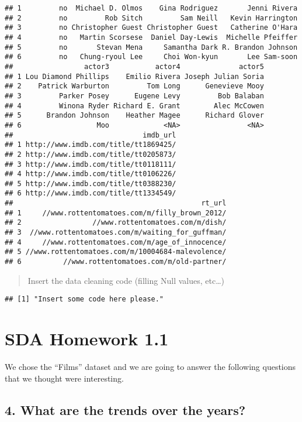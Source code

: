 \documentclass[]{article}
\begin{document}
\begin{verbatim}
## 1         no  Michael D. Olmos    Gina Rodriguez       Jenni Rivera
## 2         no         Rob Sitch         Sam Neill   Kevin Harrington
## 3         no Christopher Guest Christopher Guest   Catherine O'Hara
## 4         no   Martin Scorsese  Daniel Day-Lewis  Michelle Pfeiffer
## 5         no       Stevan Mena     Samantha Dark R. Brandon Johnson
## 6         no   Chung-ryoul Lee     Choi Won-kyun       Lee Sam-soon
##                 actor3           actor4              actor5
## 1 Lou Diamond Phillips    Emilio Rivera Joseph Julian Soria
## 2    Patrick Warburton         Tom Long      Genevieve Mooy
## 3         Parker Posey      Eugene Levy         Bob Balaban
## 4         Winona Ryder Richard E. Grant        Alec McCowen
## 5      Brandon Johnson    Heather Magee      Richard Glover
## 6                  Moo             <NA>                <NA>
##                               imdb_url
## 1 http://www.imdb.com/title/tt1869425/
## 2 http://www.imdb.com/title/tt0205873/
## 3 http://www.imdb.com/title/tt0118111/
## 4 http://www.imdb.com/title/tt0106226/
## 5 http://www.imdb.com/title/tt0388230/
## 6 http://www.imdb.com/title/tt1334549/
##                                             rt_url
## 1     //www.rottentomatoes.com/m/filly_brown_2012/
## 2                 //www.rottentomatoes.com/m/dish/
## 3  //www.rottentomatoes.com/m/waiting_for_guffman/
## 4     //www.rottentomatoes.com/m/age_of_innocence/
## 5 //www.rottentomatoes.com/m/10004684-malevolence/
## 6          //www.rottentomatoes.com/m/old-partner/
\end{verbatim}

\begin{quote}
Insert the data cleaning code (filling Null values, etc\ldots)
\end{quote}

\begin{verbatim}
## [1] "Insert some code here please."
\end{verbatim}

\hypertarget{sda-homework-1.1}{%
\section{SDA Homework 1.1}\label{sda-homework-1.1}}

We chose the ``Films'' dataset and we are going to answer the following
questions that we thought were interesting.

\hypertarget{what-are-the-trends-over-the-years}{%
\subsection{4. What are the trends over the
years?}\label{what-are-the-trends-over-the-years}}
\end{document}
